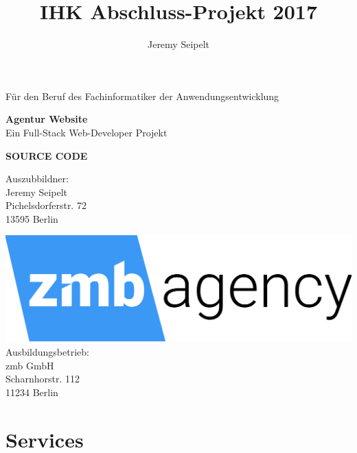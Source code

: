 \documentclass[11pt,a4paper]{article}
\author{Jeremy Seipelt}
\title{IHK Abschluss-Projekt 2017}
\begin{document}
\clearpage\maketitle
\thispagestyle{empty}
	\begin{center}
		\begin{Large}
		
			
			Für den Beruf des Fachinformatiker der Anwendungsentwicklung\\
			
		\end{Large}
	\end{center}
 
 	\begin{center}
		\begin{LARGE}
			 \textbf{Agentur Website}\\			 
		 Ein Full-Stack Web-Developer Projekt\\
		\end{LARGE}
	\end{center}
	\begin{center}
		\begin{LARGE}
		 \textbf{\textsc{SOURCE CODE}}
		\end{LARGE}
	\end{center}
	\begin{center}
	Auszubbildner: \\ 
 	Jeremy Seipelt\\
 	Pichelsdorferstr. 72\\
	 13595 Berlin\\
	\end{center}	
	
	\begin{center}
		\includegraphics[scale=0.05]{logo_zmb}\\
 		Ausbildungsbetrieb:\\
 		zmb GmbH\\
 		Scharnhorstr. 112\\
 		11234 Berlin \\
 	\end{center}
\newpage
\tableofcontents
\newpage
\section{Services}
\end{document}
